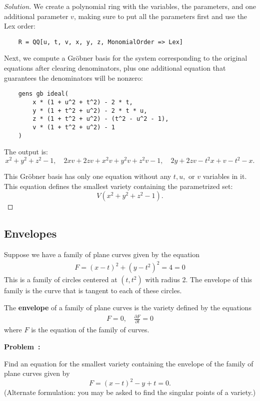 \documentclass[12pt]{article}
\newcounter{problem}
\newenvironment{problem}[1][Problem]{%
	\refstepcounter{problem}%
	\noindent\textbf{\color{magenta}#1~\theproblem: }%
}{}
\newenvironment{solution}
    {\renewcommand{\qedsymbol}{}\begin{proof}[Solution]}
    {\end{proof}}
\begin{document}
\begin{solution}
	We create a polynomial ring with the variables, the parameters, and one additional parameter \( v \), making sure to put all the parameters first and use the Lex order:
	\begin{verbatim}
    R = QQ[u, t, v, x, y, z, MonomialOrder => Lex]
    \end{verbatim}

	Next, we compute a Gr\"obner basis for the system corresponding to the original equations after clearing denominators, plus one additional equation that guarantees the denominators will be nonzero:
	\begin{verbatim}
    gens gb ideal(
        x * (1 + u^2 + t^2) - 2 * t, 
        y * (1 + t^2 + u^2) - 2 * t * u, 
        z * (1 + t^2 + u^2) - (t^2 - u^2 - 1), 
        v * (1 + t^2 + u^2) - 1
    )
    \end{verbatim}

	The output is:
	\[
		x^2 + y^2 + z^2 - 1, \quad
		2xv + 2zv + x^2v + y^2v + z^2v - 1, \quad
		2y + 2zv - t^2x + v - t^2 - x.
	\]

	This Gr\"obner basis has only one equation without any \( t, u, \) or \( v \) variables in it. This equation defines the smallest variety containing the parametrized set:
	\[
		\boxed{V(x^2 + y^2 + z^2 - 1)}.
	\]
\end{solution}

\subsection{Envelopes}

Suppose we have a family of plane curves given by the equation
\begin{align*}
	F = (x - t)^2 + (y-t^2)^2 = 4 = 0
\end{align*} This is a family of circles centered at \((t, t^2)\) with radius 2. The envelope of this family is the curve that is tangent to each of these circles. \begin{definition}
	The \textbf{envelope} of a family of plane curves is the variety defined by the equations \begin{align*}
		F = 0, \quad \frac{\partial F}{\partial t} = 0
	\end{align*}
	where \(F\) is the equation of the family of curves.
\end{definition}

\begin{problem}
Find an equation for the smallest variety containing the envelope of the family of plane curves given by
\[
	F = (x - t)^2 - y + t = 0.
\]
(Alternate formulation: you may be asked to find the singular points of a variety.)
\end{problem}
\end{document}
